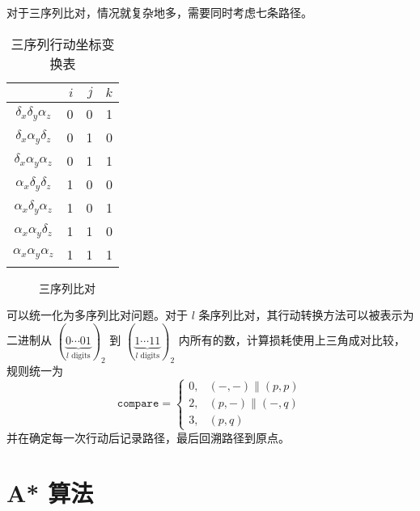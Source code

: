     对于三序列比对，情况就复杂地多，需要同时考虑七条路径。

    \begin{minipage}{0.48\textwidth}
        \begin{table}[H]
            \centering
            \caption{三序列行动坐标变换表}\label{tab:multiple}
            \begin{tabular}{crrr}
                \toprule
                    & $i$ & $j$ & $k$ \\
                \midrule
                $\delta_x\delta_y\alpha_z$ & 0 & 0 & 1\\
                $\delta_x\alpha_y\delta_z$ & 0 & 1 & 0 \\
                $\delta_x\alpha_y\alpha_z$ & 0 & 1 & 1 \\
                $\alpha_x\delta_y\delta_z$ & 1 & 0 & 0 \\
                $\alpha_x\delta_y\alpha_z$ & 1 & 0 & 1 \\
                $\alpha_x\alpha_y\delta_z$ & 1 & 1 & 0 \\
                $\alpha_x\alpha_y\alpha_z$ & 1 & 1 & 1 \\
                \bottomrule
            \end{tabular}
        \end{table}
    \end{minipage}\hfil
    \begin{minipage}{0.48\textwidth}
        \begin{figure}[H]
            \centering
            
            \caption{三序列比对}\label{fig:multipledp}
        \end{figure}
    \end{minipage}
    \medskip

    可以统一化为多序列比对问题。对于 $l$ 条序列比对，其行动转换方法可以被表示为二进制从 $(\underbrace{0\cdots01}_{l\text{ digits}})_2$ 到 $(\underbrace{1\cdots11}_{l\text{ digits}})_2$ 内所有的数，计算损耗使用上三角成对比较，规则统一为
    \begin{equation*}
        \texttt{compare}=
        \begin{cases}
            0,& (-,-) \| (p,p) \\
            2,& (p,-) \| (-,q) \\
            3,& (p,q)
        \end{cases}
    \end{equation*}
    并在确定每一次行动后记录路径，最后回溯路径到原点。


    \section{A* 算法}

    

    

    

